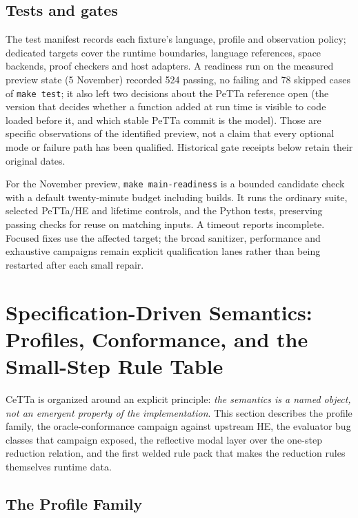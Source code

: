 \documentclass[11pt]{article}
\newcommand{\code}[1]{\texttt{#1}}
\newcommand{\PeTTa}{\textup{PeTTa}}
\newcommand{\HE}{\textup{HE}}
\newcommand{\CeTTa}{\textup{CeTTa}}
\begin{document}
\subsection{Tests and gates}

The test manifest records each fixture's language, profile and observation
policy; dedicated targets cover the runtime boundaries, language references,
space backends, proof checkers and host adapters.  A readiness run on the
measured preview state (5 November) recorded 524 passing, no failing and 78
skipped cases of \code{make test}; it also left two decisions about the
\PeTTa{} reference open (the version that decides whether a function added at
run time is visible to code loaded before it, and which stable \PeTTa{} commit
is the model).  Those are specific observations of the identified preview,
not a claim that every optional mode or failure path has been qualified.
Historical gate receipts below retain their original dates.

For the November preview, \code{make main-readiness} is a bounded candidate
check with a default twenty-minute budget including builds.  It runs the
ordinary suite, selected \PeTTa{}/\HE{} and lifetime controls, and the Python
tests, preserving passing checks for reuse on matching inputs.  A timeout
reports incomplete.  Focused fixes use the affected target; the broad
sanitizer, performance and exhaustive campaigns remain explicit qualification
lanes rather than being restarted after each small repair.

\section{Specification-Driven Semantics: Profiles, Conformance, and the
  Small-Step Rule Table}
\label{sec:specdriven}

\CeTTa{} is organized around an explicit principle: \emph{the semantics
is a named object, not an emergent property of the implementation}.
This section describes the profile family, the oracle-conformance
campaign against upstream \HE{}, the evaluator bug classes that
campaign exposed, the reflective modal layer over the one-step
reduction relation, and the first welded rule pack that makes the
reduction rules themselves runtime data.

\subsection{The Profile Family}
\label{sec:profiles}
\end{document}
